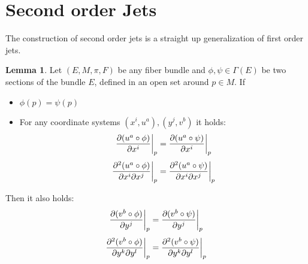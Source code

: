 \documentclass[12pt,a4paper]{report}
\theoremstyle{definition}
\theoremstyle{Theorem}
\newtheorem{Lm}[Def]{Lemma}
\theoremstyle{definition}
\theoremstyle{definition}
\begin{document}
	\section{Second order Jets}
	The construction of second order jets is a straight up generalization of first order jets.
	\begin{Lm}
		Let $(E,M,\pi,F)$ be any fiber bundle and $\phi,\psi\in\Gamma(E)$ be two sections of the bundle $E$, defined in an open set around $p\in M$. If
		\begin{itemize}
			\item $\phi(p)=\psi(p)$ 
			\item For any coordinate systems $(x^i,u^a),(y^j,v^b)$ it holds:
			$${\partial(u^a\circ\phi) \over \partial{x^i}}\bigg|_p={\partial(u^a\circ\psi) \over \partial{x^i}}\bigg|_p$$
			$${\partial^2(u^a\circ\phi) \over \partial{x^i}\partial{x^j}}\bigg|_p={\partial^2(u^a\circ\psi) \over \partial{x^i}\partial{x^j}}\bigg|_p$$
		\end{itemize} 
		Then it also holds:
		$${\partial(v^b\circ\phi) \over \partial{y^j}}\bigg|_p={\partial(v^b\circ\psi) \over \partial{y^j}}\bigg|_p$$
		$${\partial^2(v^b\circ\phi) \over \partial{y^k}\partial{y^l}}\bigg|_p={\partial^2(v^b\circ\psi) \over \partial{y^k}\partial{y^l}}\bigg|_p$$
	\end{Lm}
\end{document}
